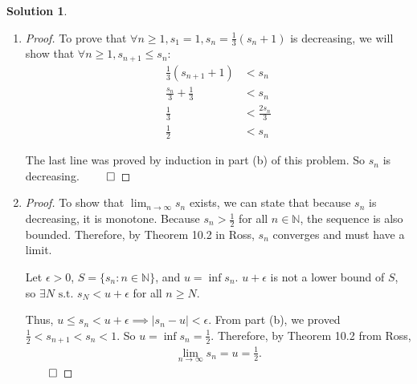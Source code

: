 \documentclass[12pt]{article}
\theoremstyle{definition} %
\newtheorem{solution}{Solution}
\theoremstyle{plain} %
\begin{document}
\begin{solution}
\begin{enumerate}
\begin{proof}
            To finish the proof, we need $\frac{1}{3}(s_{n+1} + 1) > \frac{1}{2}$:
            \begin{align}
                \frac{s_{n+1}}{3} - \frac{1}{6} &> 0 \tag{59} \\
                \frac{1}{6}(2s_{n+1} - 1) &> 0 \tag{60} \\
                s_{n+1} &> \frac{1}{2} \tag{61}
            \end{align}
        \end{proof}
        \item \begin{proof}
            To prove that $\forall n \geq 1, s_1 = 1, s_n = \frac{1}{3}(s_n + 1)$ is decreasing, we will show that $\forall n \geq 1, s_{n+1} \leq s_n$:
            \begin{align}
                \frac{1}{3}(s_{n+1} + 1) &< s_n \tag{62} \\
                \frac{s_n}{3} + \frac{1}{3} &< s_n \tag{63} \\
                \frac{1}{3} &< \frac{2s_n}{3} \tag{64} \\
                \frac{1}{2} &< s_n \tag{65}
            \end{align}
        
            The last line was proved by induction in part (b) of this problem. So $s_n$ is decreasing. $\qed$
        \end{proof}
        \item \begin{proof}
            To show that $\lim_{n \to \infty} s_n$ exists, we can state that because $s_n$ is decreasing, it is monotone. Because $s_n > \frac{1}{2}$ for all $n \in \mathbb{N}$, the sequence is also bounded. Therefore, by Theorem 10.2 in Ross, $s_n$ converges and must have a limit.
        
            Let $\epsilon > 0$, $S = \{s_n : n \in \mathbb{N}\}$, and $u = \inf s_n$. $u + \epsilon$ is not a lower bound of $S$, so $\exists N \text{ s.t. } s_N < u + \epsilon$ for all $n \geq N$.
        
            Thus, $u \leq s_n < u + \epsilon \implies |s_n - u| < \epsilon$. From part (b), we proved $\frac{1}{2} < s_{n+1} < s_n < 1$. So $u = \inf s_n = \frac{1}{2}$. Therefore, by Theorem 10.2 from Ross, 
            \begin{align}
            \lim_{n \to \infty} s_n = u = \frac{1}{2}.
            \end{align}
            $\qed$
        \end{proof}
    \end{enumerate}
\end{solution}
\end{document}
